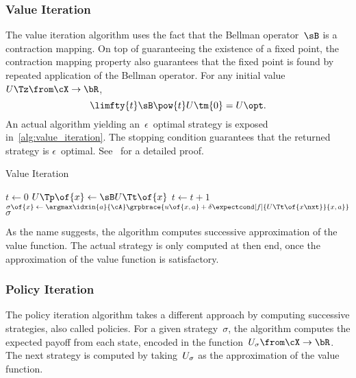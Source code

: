 \subsubsection{Value Iteration}

The value iteration algorithm uses the fact that the Bellman operator~\(\sB\) is a contraction mapping.
On top of guaranteeing the existence of a fixed point, the contraction mapping property also guarantees that the fixed point is found by repeated application of the Bellman operator.
For any initial value~\(U\Tz \from \cX \to \bR\),
\[
\limfty{t} \sB\pow{t} U\tm{0} = U\opt.
\]
An actual algorithm yielding an~\(\epsilon\)~optimal strategy is exposed in~\cref{alg:value_iteration}.
The stopping condition guarantees that the returned strategy is \(\epsilon\)~optimal.
See~\cite[Theorem~6.3.1]{puterman:1994} for a detailed proof.

\begin{algorithm}[pht]
  \caption{Value Iteration}
  \label{alg:value_iteration}
  \begin{algorithmic}
      \State \(t \gets 0\)
      \Repeat
          \State \(U\Tp \of {x} \gets \sB U\Tt \of {x}\)
        \EndFor
        \State \(t \gets t+1\)
        \State \(\sigma \of {x} \gets \argmax\idxin{a}{\cA} \grpbrace{ u\of{x,a} + \delta \expectcond[f]{U\Tt \of{x\nxt}}{x,a}}\)
      \EndFor
      \State \Return \(\sigma\)
    \EndProcedure
  \end{algorithmic}
\end{algorithm}

As the name suggests, the algorithm computes successive approximation of the value function.
The actual strategy is only computed at then end, once the approximation of the value function is satisfactory.

\subsubsection{Policy Iteration}

The policy iteration algorithm takes a different approach by computing successive strategies, also called policies.
For a given strategy~\(\sigma\), the algorithm computes the expected payoff from each state, encoded in the function~\(U\strat{\sigma} \from \cX \to \bR\).
The next strategy is computed by taking~\(U_{\sigma}\) as the approximation of the value function.

